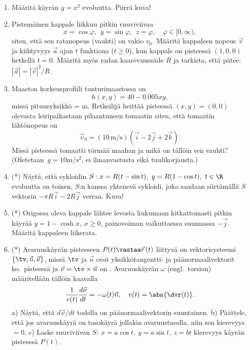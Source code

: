 \begin{enumerate}
\item
Määritä käyrän $y=x^2$ evoluutta. Piirrä kuva!

\item
Pistemäinen kappale liikkuu pitkin ruuviviivaa
\[
x=\cos \varphi,\ \ y=\sin \varphi,\ \ z=\varphi, \quad\varphi \in [0,\infty),
\]
siten, että sen ratanopeus (vauhti) on vakio $v_0$. Määritä kappaleen nopeus
$\vec{v}$ ja kiihtyvyys $\vec{a}$ ajan $t$ funktiona ($t\geq 0$), kun kappale on pisteessä 
$(1,0,0)$ hetkellä $t=0$. Määritä myös radan kaarevuussäde $R$ ja tarkista, että pätee:
$|\vec{a}|=|\vec{v}|^2/R$.

\item
Maaston korkeusprofiili tunturimaastossa on
\[
h(x,y)=40-0.005xy,
\]
missä pituusyksikkö = m. Retkeilijä heittää pisteessä $(x,y)=(0,0)$ olevasta leiripaikastaan
pilaantuneen tomaatin siten, että tomaatin lähtönopeus on 
\[
\vec v_0=(10\,\text{m}/\text{s})(\vec i-2\vec j+2\vec k).
\]
Missä pisteessä tomaatti törmää maahan ja mikä on tällöin sen vauhti? 
(Oletetaan $\,g=10\text{m}/\text{s}^2$, ei ilmanvastusta eikä tuulikorjausta.)

\item (*)
Näytä, että sykloidin $S: x=R(t-\sin t),\ y=R(1-\cos t),\ t\in\R$ evoluutta on toinen, $S$:n
kanssa yhtenevä sykloidi, joka saadaan siirtämällä $S\,$ vektorin
$-\pi R\vec i-2R\vec j$ verran. Kuva!

\item (*)
Origossa oleva kappale lähtee levosta liukumaan kitkattomasti pitkin käyrää 
$y=1-\cosh x,\ x \ge 0$, painovoiman vaikuttaessa suunnassa $-\vec j$. Määritä kappaleen 
liikerata.

\item (*) \label{H-dif-3: kierevyys}
  
Avaruuskäyrän pisteeseen $P(t)\vastaa\vec r\,(t)$ liittyvä  on
vektorisysteemi $\{\tv,\vec n,\vec\nu\}$, missä $\tv$ ja $\vec n$ ovat yksikkö\-tangentti- ja 
päänormaalivektorit ko.\ pisteessä ja $\vec\nu=\tv\times\vec n$ on . 
Avaruuskäyrän  $\omega$ (engl.\ torsion) määritellään tällöin kaavalla
\[
\frac{1}{v(t)}\frac{d\vec\nu}{dt}=-\omega(t)\vec n, \quad v(t)=\abs{\dvr(t)}.
\]
a) Näytä, että $d\vec\nu/dt$ todella on päänormaalivektorin suuntainen. \newline
b) Päättele, että jos avaruuskäyrä on tasokäyrä jollakin avaruustasolla, niin sen kierevyys 
$=0$. \newline
c) Laske ruuviviivan $S:\ x=a\cos t,\ y=a\sin t,\ z=bt$ kierevyys käyrän pisteessä $P(t)$.


\end{enumerate}
